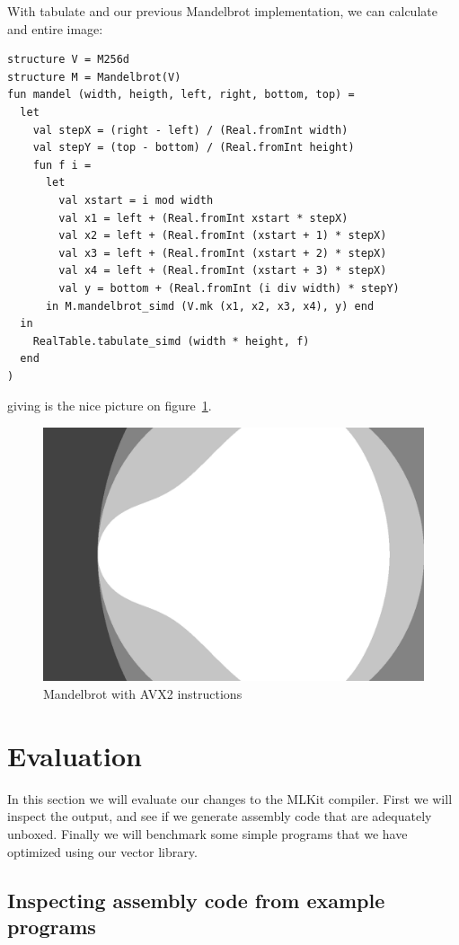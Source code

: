 \documentclass{article}
\begin{document}
With tabulate and our previous Mandelbrot implementation, we can calculate and entire image:
\begin{verbatim}
structure V = M256d
structure M = Mandelbrot(V)
fun mandel (width, heigth, left, right, bottom, top) =
  let
    val stepX = (right - left) / (Real.fromInt width)
    val stepY = (top - bottom) / (Real.fromInt height)
    fun f i =
      let
        val xstart = i mod width
        val x1 = left + (Real.fromInt xstart * stepX)
        val x2 = left + (Real.fromInt (xstart + 1) * stepX)
        val x3 = left + (Real.fromInt (xstart + 2) * stepX)
        val x4 = left + (Real.fromInt (xstart + 3) * stepX)
        val y = bottom + (Real.fromInt (i div width) * stepY)
      in M.mandelbrot_simd (V.mk (x1, x2, x3, x4), y) end
  in
    RealTable.tabulate_simd (width * height, f)
  end
)
\end{verbatim}
giving is the nice picture on figure~\ref{fig:mandel}.
\begin{figure}
    \label{fig:mandel}
    \caption{Mandelbrot with AVX2 instructions}
    \includegraphics[width=\textwidth]{mandel.png}
\end{figure}

\section{Evaluation}
In this section we will evaluate our changes to the MLKit compiler. First we will inspect the output, and see if we generate assembly code that are adequately unboxed. Finally we will benchmark some simple programs that we have optimized using our vector library.

\subsection{Inspecting assembly code from example programs}
\end{document}
